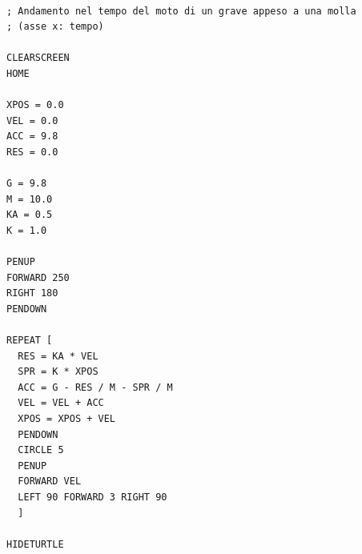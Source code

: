 \lstset{extendedchars=true, basicstyle=\scriptsize} 
\begin{lstlisting}[frame=single]  % Start your code-block

; Andamento nel tempo del moto di un grave appeso a una molla
; (asse x: tempo)

CLEARSCREEN
HOME

XPOS = 0.0
VEL = 0.0
ACC = 9.8
RES = 0.0

G = 9.8
M = 10.0
KA = 0.5
K = 1.0

PENUP
FORWARD 250
RIGHT 180
PENDOWN

REPEAT [
  RES = KA * VEL
  SPR = K * XPOS
  ACC = G - RES / M - SPR / M 
  VEL = VEL + ACC
  XPOS = XPOS + VEL
  PENDOWN
  CIRCLE 5
  PENUP
  FORWARD VEL
  LEFT 90 FORWARD 3 RIGHT 90 
  ]

HIDETURTLE
\end{lstlisting}

\vskip 1cm

